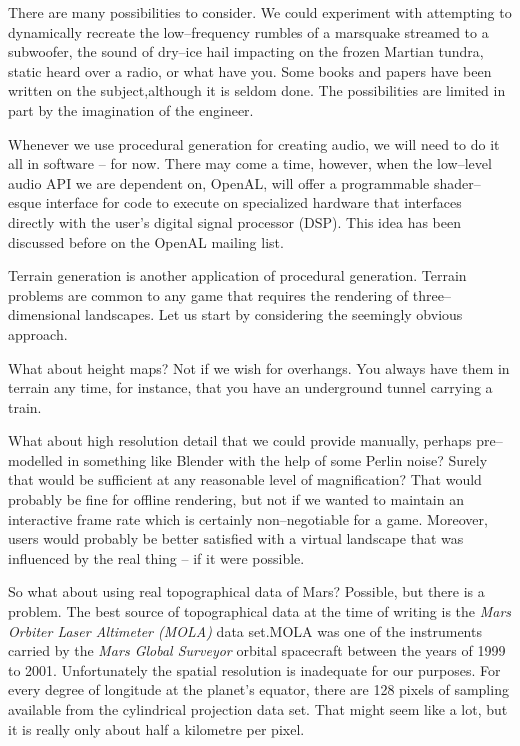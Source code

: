 There are many possibilities to consider. We could experiment with attempting to dynamically recreate the low--frequency rumbles of a marsquake streamed to a subwoofer, the sound of dry--ice hail impacting on the frozen Martian tundra, static heard over a radio, or what have you. Some books and papers have been written on the subject, although it is seldom done. The possibilities are limited in part by the imagination of the engineer.

Whenever we use procedural generation for creating audio, we will need to do it all in software -- for now. There may come a time, however, when the low--level audio API we are dependent on, OpenAL, will offer a programmable shader--esque interface for code to execute on specialized hardware that interfaces directly with the user's digital signal processor (DSP). This idea has been discussed before on the OpenAL mailing list.

Terrain generation is another application of procedural generation. Terrain problems are common to any game that requires the rendering of three--dimensional landscapes. Let us start by considering the seemingly obvious approach.

What about height maps? Not if we wish for overhangs. You always have them in terrain any time, for instance, that you have an underground tunnel carrying a train.

What about high resolution detail that we could provide manually, perhaps pre--modelled in something like Blender with the help of some Perlin noise? Surely that would be sufficient at any reasonable level of magnification? That would probably be fine for offline rendering, but not if we wanted to maintain an interactive frame rate which is certainly non--negotiable for a game. Moreover, users would probably be better satisfied with a virtual landscape that was influenced by the real thing -- if it were possible.

So what about using real topographical data of Mars? Possible, but there is a problem. The best source of topographical data at the time of writing is the {\it Mars Orbiter Laser Altimeter (MOLA)} data set.\footnotecite[mola] MOLA was one of the instruments carried by the {\it Mars Global Surveyor} orbital spacecraft between the years of 1999 to 2001. Unfortunately the spatial resolution is inadequate for our purposes. For every degree of longitude at the planet's equator, there are 128 pixels of sampling available from the cylindrical projection data set. That might seem like a lot, but it is really only about half a kilometre per pixel.

